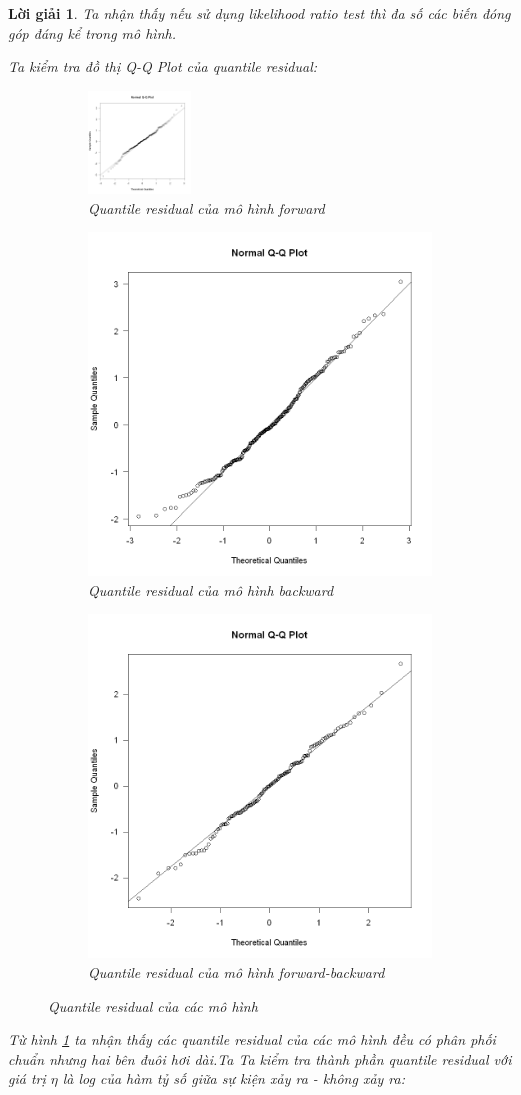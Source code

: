 \documentclass[14pt, a4paper]{article}
\theoremstyle{sltheorem}
\theoremstyle{soltheorem}
\newtheorem*{loigiai}{Lời giải}
\begin{document}
\begin{loigiai}
    Ta nhận thấy nếu sử dụng likelihood ratio test thì đa số các biến đóng góp đáng kể trong mô hình.

    Ta kiểm tra đồ thị Q-Q Plot của quantile residual:

    \begin{figure}[h!]
        \centering
        \begin{subfigure}[b]{\textwidth}
            \includegraphics[width=0.3\textwidth]{figures/mf_quantile_resid.png}
            \caption{Quantile residual của mô hình forward}
        \end{subfigure}
        \hfill
        \begin{subfigure}[b]{\linewidth}
            \includegraphics[width=0.3\linewidth]{figures/mb_quantile_resid.png}
            \caption{Quantile residual của mô hình backward}
        \end{subfigure}
        \hfill
        \begin{subfigure}[b]{\textwidth}
            \includegraphics[width=0.3\linewidth]{figures/mbo_quantile_resid.png}
            \caption{Quantile residual của mô hình forward-backward}
        \end{subfigure}
        \caption{Quantile residual của các mô hình}
        \label{fig:Quantile-residual}
    \end{figure}
    Từ hình \ref{fig:Quantile-residual} ta nhận thấy các quantile residual của các mô hình đều có phân phối chuẩn nhưng hai bên đuôi hơi dài.Ta
    Ta kiểm tra thành phần quantile residual với giá trị $\eta$ là log của hàm tỷ số giữa sự kiện xảy ra - không xảy ra:


\end{loigiai}
\end{document}
